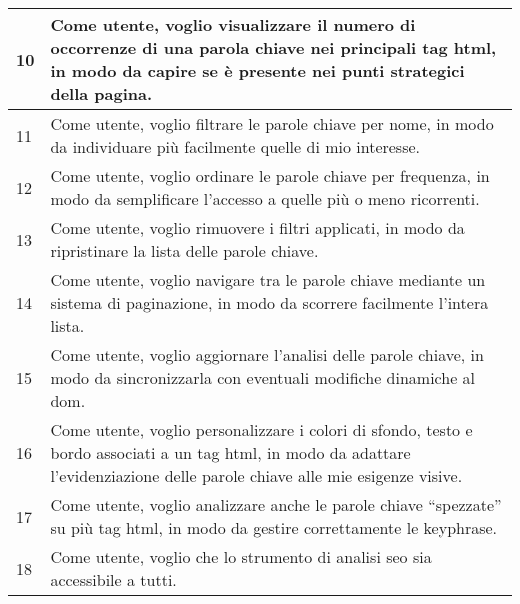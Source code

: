 \begin{tabularx}{\textwidth}{lX}
\hline
10 & Come utente, voglio visualizzare il numero di occorrenze di una parola chiave nei principali tag \gls{html}, in modo da capire se è presente nei punti strategici della pagina. \\
\hline
11 & Come utente, voglio filtrare le parole chiave per nome, in modo da individuare più facilmente quelle di mio interesse. \\
\hline
12 & Come utente, voglio ordinare le parole chiave per frequenza, in modo da semplificare l’accesso a quelle più o meno ricorrenti. \\
\hline
13 & Come utente, voglio rimuovere i filtri applicati, in modo da ripristinare la lista delle parole chiave. \\
\hline
14 & Come utente, voglio navigare tra le parole chiave mediante un sistema di paginazione, in modo da scorrere facilmente l’intera lista. \\
\hline
15 & Come utente, voglio aggiornare l'analisi delle parole chiave, in modo da sincronizzarla con eventuali modifiche dinamiche al \gls{dom}. \\
\hline
16 & Come utente, voglio personalizzare i colori di sfondo, testo e bordo associati a un tag \gls{html}, in modo da adattare l'evidenziazione delle parole chiave alle mie esigenze visive. \\
\hline
17 & Come utente, voglio analizzare anche le parole chiave “spezzate” su più tag \gls{html}, in modo da gestire correttamente le keyphrase. \\
\hline
18 & Come utente, voglio che lo strumento di analisi \gls{seo} sia accessibile a tutti. \\
\end{tabularx}